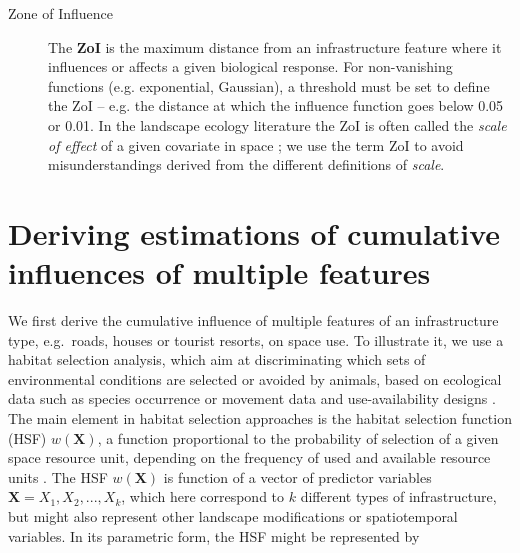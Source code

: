 \documentclass[titlepage]{article}
\begin{document}
\begin{tcolorbox}[width=1.3\textwidth,center,colback=yellow!5,colframe=yellow!75!black,title={Box 1 -- Definitions}]
\begin{description}
    \item[Zone of Influence] The \textbf{ZoI} is the maximum distance from an infrastructure feature where it influences or affects a given biological response. For non-vanishing functions (e.g. exponential, Gaussian), a threshold must be set to define the ZoI -- e.g. the distance at which the influence function goes below 0.05 or 0.01. 
    In the landscape ecology literature the ZoI is often called the \textit{scale of effect} of a given covariate in space \citep[e.g.][]{jackson_are_2015}; we use the term ZoI to avoid misunderstandings derived from the different definitions of \textit{scale}. 
    

\end{description}
\end{tcolorbox}

\section{Deriving estimations of cumulative influences of multiple features}

We first derive the cumulative influence of multiple features of an infrastructure type, e.g.\ roads, houses or tourist resorts, on space use. To illustrate it, we use a habitat selection analysis, which aim at discriminating which sets of environmental conditions are selected or avoided by animals, based on ecological data such as species occurrence or movement data and use-availability designs \citep{fieberg_how_2021}. The main element in habitat selection approaches is the habitat selection function (HSF) $w(\textbf{X})$, a function proportional to the probability of selection of a given space resource unit, depending on the frequency of used and available resource units \citep{thurfjell_applications_2014}. The HSF $w(\textbf{X})$ is function of a vector of predictor variables $\textbf{X} = X_1,X_2, ...,  X_k$, which here correspond to $k$ different types of infrastructure, but might also represent other landscape modifications or spatiotemporal variables. In its parametric form, the HSF might be represented by
\end{document}

